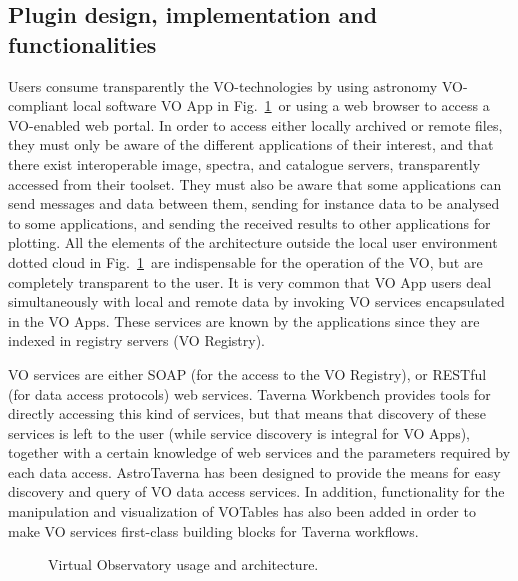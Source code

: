 \documentclass[final,authoryear,5p,times,twocolumn]{elsarticle}
\begin{document}
\subsection{Plugin design, implementation and functionalities}
\label{Opening}

Users consume transparently the VO-technologies by using astronomy VO-compliant local software \textendash VO App in Fig.~\ref{fig:VOArch}\textendash\ or using a web browser to access a VO-enabled web portal. In order to access either locally archived or remote files, they must only be aware of the different applications of their interest, and that there exist interoperable image, spectra, and catalogue servers, transparently accessed from their toolset. They must also be aware that some applications can send messages and data between them, sending for instance data to be analysed to some applications, and sending the received results to other applications for plotting. All the elements of the architecture outside the local user environment \textendash dotted cloud in Fig.~\ref{fig:VOArch}\textendash\ are indispensable for the operation of the VO, but are completely transparent to the user. It is very common that VO App users deal simultaneously with local and remote data by invoking VO services encapsulated in the VO Apps. These services are known by the applications since they are indexed in registry servers (VO Registry).

VO services are either SOAP (for the access to the VO Registry), or RESTful (for data access protocols) web services. Taverna Workbench provides tools for directly accessing this kind of services, but that means that discovery of these services is left to the user (while service discovery is integral for VO Apps), together with a certain knowledge of web services and the parameters required by each data access. AstroTaverna has been designed to provide the means for easy discovery and query of VO data access services. In addition, functionality for the manipulation and visualization of VOTables has also been added in order to make VO services first-class building blocks for Taverna workflows.

\begin{figure}[tb]
\centering
{} 
\caption{Virtual Observatory usage and architecture.}
\label{fig:VOArch}
\end{figure}
\end{document}
